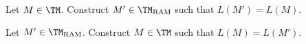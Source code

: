   \begin{tightlist}
    \item Let $M \in \TM$. Construct $M' \in \TM_{\operatorname{RAM}}$
    such that $L(M') = L(M)$.
    \item Let $M' \in \TM_{\operatorname{RAM}}$.
    Construct $M \in \TM$ such that $L(M) = L(M')$.
  \end{tightlist}
